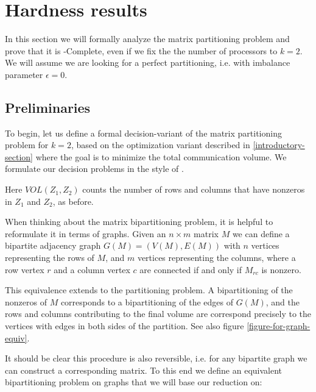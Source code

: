 \documentclass{article}
\newcommand{\mbpt}{\textsc{Matrix \allowbreak Bipartition} }
\begin{document}
	\section{Hardness results}
	In this section we will formally analyze the matrix partitioning
	problem and prove that it is \NP-Complete, even if we fix the
	the number of processors to $k = 2$. We will assume we are looking
	for a perfect partitioning, i.e. with imbalance parameter $\epsilon = 0$.

	\subsection{Preliminaries}
	To begin, let us define a formal decision-variant of the matrix
	partitioning problem for $k = 2$, based on the optimization
	variant described in \ref{introductory-section} where the goal
	is to minimize the total communication volume. We formulate our
	decision problems in the style of \cite{npbook}.

	\begin{problem}
		\problemtitle{\mbpt}
	\end{problem}

	Here $VOL(Z_1, Z_2)$ counts the number of rows and columns that
	have nonzeros in $Z_1$ and $Z_2$, as before.

	When thinking about the matrix bipartitioning problem, it is helpful
	to reformulate it in terms of graphs. Given an $n \times m$ matrix $M$
	we can define a bipartite adjacency graph $G(M) = (V(M), E(M))$ with
	$n$ vertices representing the rows of $M$, and $m$ vertices representing
	the columns, where a row vertex $r$ and a column vertex $c$ are connected
	if and only if $M_{rc}$ is nonzero.

	This equivalence extends to the partitioning problem. A bipartitioning of
	the nonzeros of $M$ corresponds to a bipartitioning of the edges of $G(M)$,
	and the rows and columns contributing to the final volume are correspond
	precisely to the vertices with edges in both sides of the partition. See
	also figure \ref{figure-for-graph-equiv}. 

	It should be clear this procedure is also reversible, i.e. for any
	bipartite graph we can construct a corresponding matrix.
	To this end we define an equivalent bipartitioning problem on graphs that
	we will base our reduction on:
\end{document}
